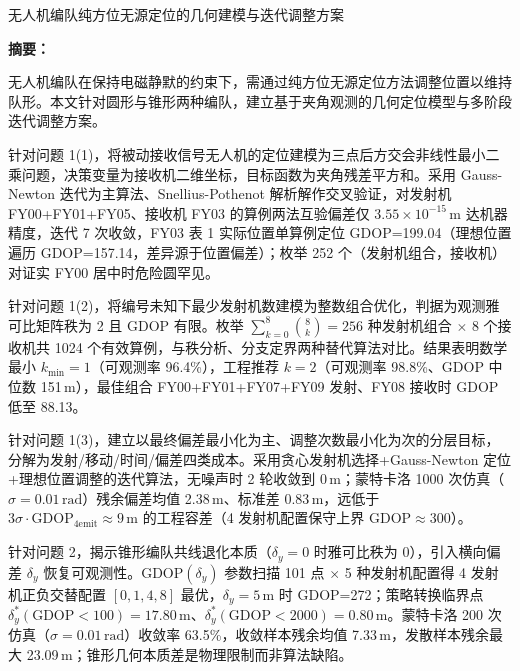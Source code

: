 \documentclass[12pt,a4paper]{ctexart}
\newcommand{\unit}[1]{\ensuremath{\,\mathrm{#1}}}
\begin{document}
\begin{center}
    {\heiti 无人机编队纯方位无源定位的几何建模与迭代调整方案}
\end{center}

\bigskip

\noindent\textbf{摘要：}

无人机编队在保持电磁静默的约束下，需通过纯方位无源定位方法调整位置以维持队形。本文针对圆形与锥形两种编队，建立基于夹角观测的几何定位模型与多阶段迭代调整方案。

针对问题 1(1)，将被动接收信号无人机的定位建模为三点后方交会非线性最小二乘问题，决策变量为接收机二维坐标，目标函数为夹角残差平方和。采用 Gauss-Newton 迭代为主算法、Snellius-Pothenot 解析解作交叉验证，对发射机 FY00+FY01+FY05、接收机 FY03 的算例两法互验偏差仅 $3.55\times10^{-15}\unit{m}$ 达机器精度，迭代 7 次收敛，FY03 表 1 实际位置单算例定位 GDOP=199.04（理想位置遍历 GDOP=157.14，差异源于位置偏差）；枚举 252 个（发射机组合，接收机）对证实 FY00 居中时危险圆罕见。

针对问题 1(2)，将编号未知下最少发射机数建模为整数组合优化，判据为观测雅可比矩阵秩为 2 且 GDOP 有限。枚举 $\sum_{k=0}^{8}\binom{8}{k}=256$ 种发射机组合 $\times$ 8 个接收机共 1024 个有效算例，与秩分析、分支定界两种替代算法对比。结果表明数学最小 $k_{\min}=1$（可观测率 96.4\%），工程推荐 $k=2$（可观测率 98.8\%、GDOP 中位数 151\unit{m}），最佳组合 FY00+FY01+FY07+FY09 发射、FY08 接收时 GDOP 低至 88.13。

针对问题 1(3)，建立以最终偏差最小化为主、调整次数最小化为次的分层目标，分解为发射/移动/时间/偏差四类成本。采用贪心发射机选择+Gauss-Newton 定位+理想位置调整的迭代算法，无噪声时 2 轮收敛到 0\unit{m}；蒙特卡洛 1000 次仿真（$\sigma=0.01\unit{rad}$）残余偏差均值 2.38\unit{m}、标准差 0.83\unit{m}，远低于 $3\sigma\cdot\text{GDOP}_{4\text{emit}}\approx 9\unit{m}$ 的工程容差（4 发射机配置保守上界 GDOP$\approx 300$）。

针对问题 2，揭示锥形编队共线退化本质（$\delta_y=0$ 时雅可比秩为 0），引入横向偏差 $\delta_y$ 恢复可观测性。GDOP$(\delta_y)$ 参数扫描 101 点 $\times$ 5 种发射机配置得 4 发射机正负交替配置 $[0,1,4,8]$ 最优，$\delta_y=5\unit{m}$ 时 GDOP=272；策略转换临界点 $\delta_y^*(\text{GDOP}<100)=17.80\unit{m}$、$\delta_y^*(\text{GDOP}<2000)=0.80\unit{m}$。蒙特卡洛 200 次仿真（$\sigma=0.01\unit{rad}$）收敛率 63.5\%，收敛样本残余均值 7.33\unit{m}，发散样本残余最大 23.09\unit{m}；锥形几何本质差是物理限制而非算法缺陷。
\end{document}
